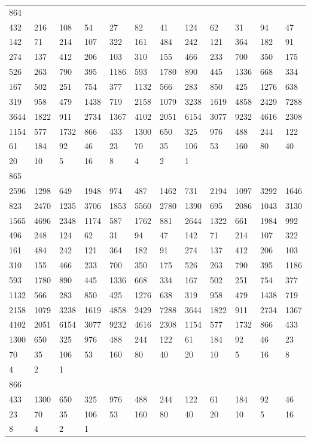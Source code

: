\begin{longtable}{llllllllllll}
864&&&&&&&&&&&\\
432& 216& 108& 54& 27& 82& 41& 124& 62& 31& 94& 47\\
142& 71& 214& 107& 322& 161& 484& 242& 121& 364& 182& 91\\
274& 137& 412& 206& 103& 310& 155& 466& 233& 700& 350& 175\\
526& 263& 790& 395& 1186& 593& 1780& 890& 445& 1336& 668& 334\\
167& 502& 251& 754& 377& 1132& 566& 283& 850& 425& 1276& 638\\
319& 958& 479& 1438& 719& 2158& 1079& 3238& 1619& 4858& 2429& 7288\\
3644& 1822& 911& 2734& 1367& 4102& 2051& 6154& 3077& 9232& 4616& 2308\\
1154& 577& 1732& 866& 433& 1300& 650& 325& 976& 488& 244& 122\\
61& 184& 92& 46& 23& 70& 35& 106& 53& 160& 80& 40\\
20& 10& 5& 16& 8& 4& 2& 1& \\

865&&&&&&&&&&&\\
2596& 1298& 649& 1948& 974& 487& 1462& 731& 2194& 1097& 3292& 1646\\
823& 2470& 1235& 3706& 1853& 5560& 2780& 1390& 695& 2086& 1043& 3130\\
1565& 4696& 2348& 1174& 587& 1762& 881& 2644& 1322& 661& 1984& 992\\
496& 248& 124& 62& 31& 94& 47& 142& 71& 214& 107& 322\\
161& 484& 242& 121& 364& 182& 91& 274& 137& 412& 206& 103\\
310& 155& 466& 233& 700& 350& 175& 526& 263& 790& 395& 1186\\
593& 1780& 890& 445& 1336& 668& 334& 167& 502& 251& 754& 377\\
1132& 566& 283& 850& 425& 1276& 638& 319& 958& 479& 1438& 719\\
2158& 1079& 3238& 1619& 4858& 2429& 7288& 3644& 1822& 911& 2734& 1367\\
4102& 2051& 6154& 3077& 9232& 4616& 2308& 1154& 577& 1732& 866& 433\\
1300& 650& 325& 976& 488& 244& 122& 61& 184& 92& 46& 23\\
70& 35& 106& 53& 160& 80& 40& 20& 10& 5& 16& 8\\
4& 2& 1& \\

866&&&&&&&&&&&\\
433& 1300& 650& 325& 976& 488& 244& 122& 61& 184& 92& 46\\
23& 70& 35& 106& 53& 160& 80& 40& 20& 10& 5& 16\\
8& 4& 2& 1& \\


\end{longtable}
